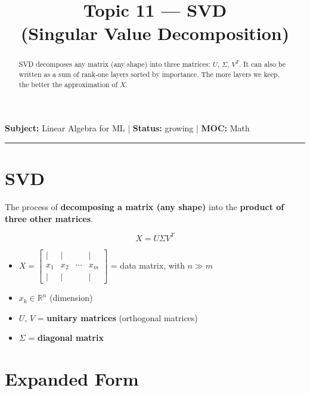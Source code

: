\documentclass[11pt,a4paper]{article}
\title{Topic 11 --- SVD\\[2pt]\large (Singular Value Decomposition)}
\author{}
\date{}
\begin{document}
\maketitle
\vspace{-2.2em}

\begin{center}
  \textbf{Subject:} Linear Algebra for ML \quad|\quad
  \textbf{Status:} growing \quad|\quad
  \textbf{MOC:} Math
\end{center}

\hrule
\vspace{4pt}

\begin{abstract}
\noindent SVD decomposes any matrix (any shape) into three matrices: $U$, $\Sigma$, $V^T$.
It can also be written as a sum of rank-one layers sorted by importance.
The more layers we keep, the better the approximation of $X$.
\end{abstract}

\section{SVD}

\begin{callout}
The process of \textbf{decomposing a matrix (any shape)} into the \textbf{product of three other matrices}.
\end{callout}

\[
  X = U \Sigma V^T
\]

\begin{itemize}
  \item $X = \begin{bmatrix} | & | & & | \\ x_1 & x_2 & \cdots & x_m \\ | & | & & | \end{bmatrix}$ = data matrix, with $n \gg m$
  \item $x_k \in \mathbb{R}^n$ (dimension)
  \item $U$, $V$ = \textbf{unitary matrices} (orthogonal matrices)
  \item $\Sigma$ = \textbf{diagonal matrix}
\end{itemize}

\section{Expanded Form}
\end{document}
